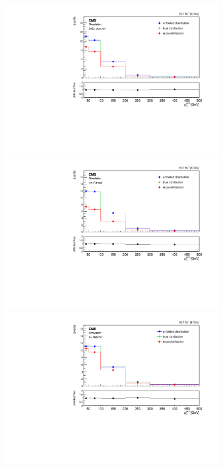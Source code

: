 \begin{figure}[hbtp]
\begin{center}
    \includegraphics[width=0.8\cmsFigWidth]{Figures/Unfolding/MCTests/PtJet1_ZZTo2e2m_MadMatrix_PowDistr_FullSample_fr}
     \includegraphics[width=0.8\cmsFigWidth]{Figures/Unfolding/MCTests/PtJet1_ZZTo4e_PowMatrix_MadDistr_FullSample_fr}     
    \includegraphics[width=0.8\cmsFigWidth]{Figures/Unfolding/MCTests/PtJet1_ZZTo4m_PowMatrix_MadDistr_FullSample_fr}     

\end{center}
\end{figure}
